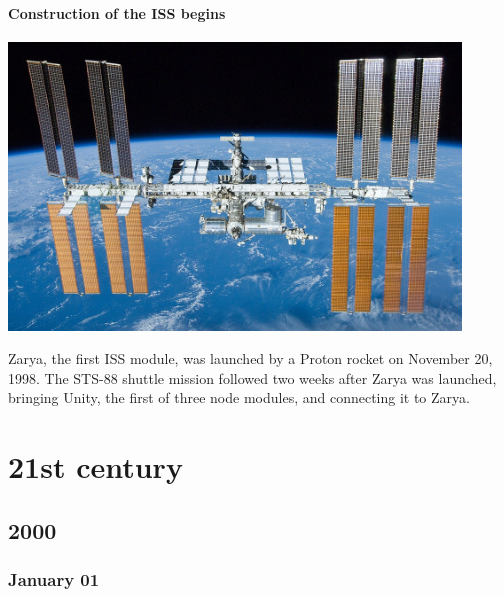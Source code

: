 \documentclass[11pt]{report}
\begin{document}
\subsection{Construction of the ISS begins}
\vspace{2mm}\begin{center}\includegraphics[width=12cm]{./img/iss.jpg}\end{center}
Zarya, the first ISS module, was launched by a Proton rocket on November 20, 1998. The STS-88 shuttle mission followed two weeks after Zarya was launched, bringing Unity, the first of three node modules, and connecting it to Zarya.




\part{21st century}
\chapter{2000}
\section{January 01}
\end{document}
